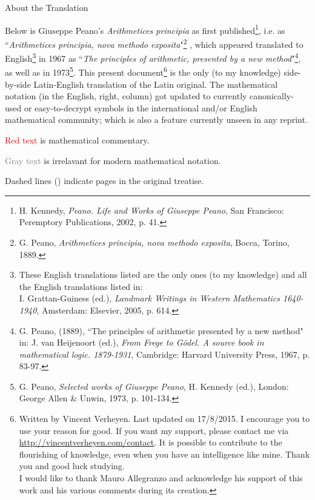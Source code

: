 \documentclass{book}
\newcommand\irrelavent[1]{\textcolor{gray}{#1}}
\begin{document}
%
\begin{paracol}{3}
  \switchcolumn[1] %

  { \Large About the Translation}

   \vspace{0.25cm}
  
   Below is Giuseppe Peano's \emph{Arithmetices principia} as first published\footnote{H. Kennedy, \emph{Peano. Life and Works of Giuseppe Peano}, San Francisco: Peremptory Publications, 2002, p. 41.}, i.e. as ``\emph{Arithmetices principia, nova methodo exposita}"\footnote{G. Peano, \emph{Arithmetices principia, nova methodo exposita}, Bocca, Torino, 1889.} , which appeared translated to English\footnote{These English translations listed are the only ones (to my knowledge) and all the English translations listed in: \\
   I. Grattan-Guiness (ed.), \emph{Landmark Writings in Western Mathematics 1640-1940}, Amsterdam: Elsevier, 2005, p. 614.} in 1967 as ``\emph{The principles of arithmetic, presented by a new method}"\footnote{G. Peano, (1889), ``The principles of arithmetic presented by a new method" in: J. van Heijenoort (ed.), \emph{From Frege to G\"odel. A source book in mathematical logic. 1879-1931}, Cambridge: Harvard University Press, 1967, p. 83-97.}, as well as in 1973\footnote{G. Peano, \emph{Selected works of Giuseppe Peano}, H. Kennedy (ed.), London: George Allen \& Unwin, 1973, p. 101-134.}.
   This present document\footnote{Written by Vincent Verheyen. Last updated on 17/8/2015. I encourage you to use your reason for good. If you want my support, please contact me via \url{http://vincentverheyen.com/contact}. It is possible to contribute to the flourishing of knowledge, even when you have an intelligence like mine. Thank you and good luck studying. \\
   I would like to thank Mauro Allegranzo and acknowledge his support of this work and his various comments during its creation.} is the only (to my knowledge) side-by-side Latin-English translation of the Latin original.
   The mathematical notation (in the English, right, column) got updated to currently canonically-used or easy-to-decrypt symbols in the international and/or English mathematical community; which is also a feature currently unseen in any reprint.

   \vspace{1cm}
   
   \textcolor{red}{Red text} is mathematical commentary.

   \irrelavent{Gray text} is irrelavant for modern mathematical notation.

   Dashed lines (\hdashrule{2cm}{0.1mm}{0.1mm 1mm}) indicate pages in the original treatise.

   \vspace{1cm}
\end{paracol}
\newpage  
\end{document}
